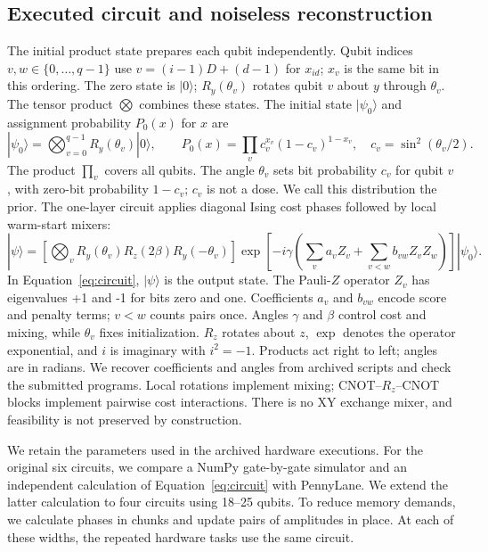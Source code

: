 \documentclass[utf8]{FrontiersinHarvard}
\begin{document}
\subsection{Executed circuit and noiseless reconstruction}
The initial product state prepares each qubit independently. Qubit indices $v,w\in\{0,\ldots,q-1\}$ use $v=(i-1)D+(d-1)$ for $x_{id}$; $x_v$ is the same bit in this ordering. The zero state is $|0\rangle$; $R_y(\theta_v)$ rotates qubit $v$ about $y$ through $\theta_v$. The tensor product $\bigotimes$ combines these states. The initial state $|\psi_0\rangle$ and assignment probability $P_0(x)$ for $x$ are
\begin{equation}
 |\psi_0\rangle=\bigotimes_{v=0}^{q-1}R_y(\theta_v)|0\rangle,
 \qquad P_0(x)=\prod_v c_v^{x_v}(1-c_v)^{1-x_v},\quad
 c_v=\sin^2(\theta_v/2).
 \label{eq:prior}
\end{equation}
The product $\prod_v$ covers all qubits. The angle $\theta_v$ sets bit probability $c_v$ for qubit $v$, with zero-bit probability $1-c_v$; $c_v$ is not a dose. We call this distribution the prior. The one-layer circuit applies diagonal Ising cost phases followed by local warm-start mixers:
\begin{equation}
 |\psi\rangle=\left[\bigotimes_v R_y(\theta_v)R_z(2\beta)R_y(-\theta_v)\right]
 \exp\!\left[-i\gamma\left(\sum_v a_vZ_v+\sum_{v<w}b_{vw}Z_vZ_w\right)\right]|\psi_0\rangle.
 \label{eq:circuit}
\end{equation}
In Equation~\ref{eq:circuit}, $|\psi\rangle$ is the output state. The Pauli-$Z$ operator $Z_v$ has eigenvalues +1 and -1 for bits zero and one. Coefficients $a_v$ and $b_{vw}$ encode score and penalty terms; $v<w$ counts pairs once. Angles $\gamma$ and $\beta$ control cost and mixing, while $\theta_v$ fixes initialization. $R_z$ rotates about $z$, $\exp$ denotes the operator exponential, and $i$ is imaginary with $i^2=-1$. Products act right to left; angles are in radians. We recover coefficients and angles from archived scripts and check the submitted programs. Local rotations implement mixing; CNOT--$R_z$--CNOT blocks implement pairwise cost interactions. There is no XY exchange mixer, and feasibility is not preserved by construction.

We retain the parameters used in the archived hardware executions. For the original six circuits, we compare a NumPy gate-by-gate simulator and an independent calculation of Equation~\ref{eq:circuit} with PennyLane. We extend the latter calculation to four circuits using 18--25 qubits. To reduce memory demands, we calculate phases in chunks and update pairs of amplitudes in place. At each of these widths, the repeated hardware tasks use the same circuit.
\end{document}
